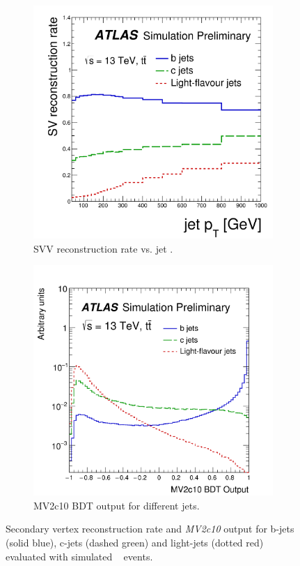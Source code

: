 \begin{figure}[h!]
\centering
\captionsetup{justification=centering}
    \begin{subfigure}[b]{0.4\textwidth}
        \includegraphics[width=\textwidth]{figures/object/b_sv}
        \caption{SVV reconstruction rate vs. jet \pt.}
        \label{fig:obj_b_sv}
    \end{subfigure}
    \quad
    \begin{subfigure}[b]{0.43\textwidth}
        \includegraphics[width=\textwidth]{figures/object/b_mv2}
        \caption{MV2c10 BDT output for different jets.}
        \label{fig:obj_b_mv2}
    \end{subfigure}
\caption{Secondary vertex reconstruction rate and \emph{MV2c10} output for b-jets (solid blue), c-jets (dashed green) and light-jets (dotted red) evaluated with simulated \ttbar~ events.}
\label{fig:obj_btag}
\end{figure}


